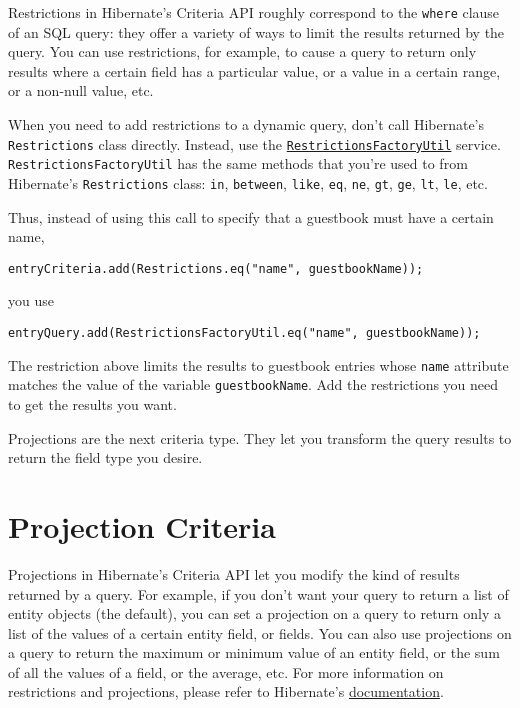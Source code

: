 Restrictions in Hibernate's Criteria API roughly correspond to the
\texttt{where} clause of an SQL query: they offer a variety of ways to
limit the results returned by the query. You can use restrictions, for
example, to cause a query to return only results where a certain field
has a particular value, or a value in a certain range, or a non-null
value, etc.

When you need to add restrictions to a dynamic query, don't call
Hibernate's \texttt{Restrictions} class directly. Instead, use the
\href{https://docs.liferay.com/dxp/portal/7.2-latest/javadocs/portal-kernel/com/liferay/portal/kernel/dao/orm/RestrictionsFactoryUtil.html}{\texttt{RestrictionsFactoryUtil}}
service. \texttt{RestrictionsFactoryUtil} has the same methods that
you're used to from Hibernate's \texttt{Restrictions} class:
\texttt{in}, \texttt{between}, \texttt{like}, \texttt{eq}, \texttt{ne},
\texttt{gt}, \texttt{ge}, \texttt{lt}, \texttt{le}, etc.

Thus, instead of using this call to specify that a guestbook must have a
certain name,

\begin{verbatim}
entryCriteria.add(Restrictions.eq("name", guestbookName));
\end{verbatim}

you use

\begin{verbatim}
entryQuery.add(RestrictionsFactoryUtil.eq("name", guestbookName));
\end{verbatim}

The restriction above limits the results to guestbook entries whose
\texttt{name} attribute matches the value of the variable
\texttt{guestbookName}. Add the restrictions you need to get the results
you want.

Projections are the next criteria type. They let you transform the query
results to return the field type you desire.

\section{Projection Criteria}\label{projection-criteria}

Projections in Hibernate's Criteria API let you modify the kind of
results returned by a query. For example, if you don't want your query
to return a list of entity objects (the default), you can set a
projection on a query to return only a list of the values of a certain
entity field, or fields. You can also use projections on a query to
return the maximum or minimum value of an entity field, or the sum of
all the values of a field, or the average, etc. For more information on
restrictions and projections, please refer to Hibernate's
\href{http://docs.jboss.org/hibernate/orm/3.6/reference/en-US/html/querycriteria.html}{documentation}.

